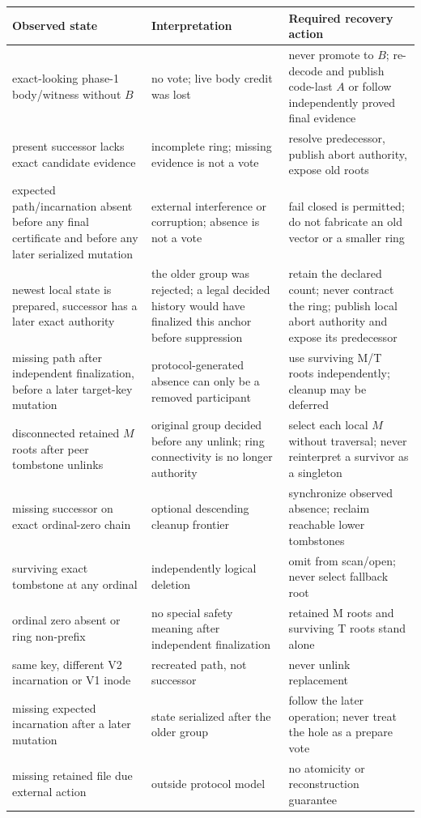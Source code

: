 \documentclass[10pt,twocolumn]{article}
\theoremstyle{remark}
\begin{document}
\begin{center}
\footnotesize
\begin{tabularx}{\columnwidth}{@{}>{\raggedright\arraybackslash}X
  >{\raggedright\arraybackslash}X
  >{\raggedright\arraybackslash}X@{}}
\toprule
Observed state & Interpretation & Required recovery action \\
\midrule
exact-looking phase-1 body/witness without $B$ & no vote; live body credit was lost & never promote
to $B$; re-decode and publish code-last $A$ or follow independently proved final evidence \\
present successor lacks exact candidate evidence & incomplete ring; missing evidence is not a vote & resolve predecessor, publish abort authority, expose old roots \\
expected path/incarnation absent before any final certificate and before any later serialized mutation & external interference or corruption; absence is not a vote & fail closed is permitted; do not fabricate an old vector or a smaller ring \\
newest local state is prepared, successor has a later exact authority & the older group was rejected; a legal decided history would have finalized this anchor before suppression & retain the declared count; never contract the ring; publish local abort authority and expose its predecessor \\
missing path after independent finalization, before a later target-key mutation & protocol-generated absence can only be a removed participant & use surviving M/T roots independently; cleanup may be deferred \\
disconnected retained $M$ roots after peer tombstone unlinks & original group decided before any unlink; ring connectivity is no longer authority & select each local $M$ without traversal; never reinterpret a survivor as a singleton \\
missing successor on exact ordinal-zero chain & optional descending cleanup frontier & synchronize observed absence; reclaim reachable lower tombstones \\
surviving exact tombstone at any ordinal & independently logical deletion & omit from scan/open; never select fallback root \\
ordinal zero absent or ring non-prefix & no special safety meaning after independent finalization & retained M roots and surviving T roots stand alone \\
same key, different V2 incarnation or V1 inode & recreated path, not successor & never unlink replacement \\
missing expected incarnation after a later mutation & state serialized after the older group & follow the later operation; never treat the hole as a prepare vote \\
missing retained file due external action & outside protocol model & no atomicity or reconstruction guarantee \\
\bottomrule
\end{tabularx}
\end{center}
\end{document}
